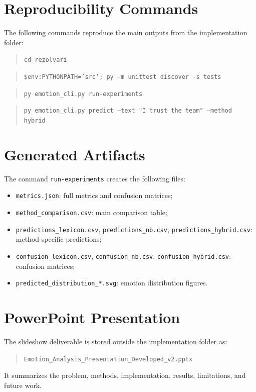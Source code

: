 \section{Reproducibility Commands}

The following commands reproduce the main outputs from the implementation folder:

\begin{quote}
\texttt{cd rezolvari}
\end{quote}

\begin{quote}
\texttt{\$env:PYTHONPATH='src'; py -m unittest discover -s tests}
\end{quote}

\begin{quote}
\texttt{py emotion\_cli.py run-experiments}
\end{quote}

\begin{quote}
\texttt{py emotion\_cli.py predict --text "I trust the team" --method hybrid}
\end{quote}

\section{Generated Artifacts}

The command \texttt{run-experiments} creates the following files:

\begin{itemize}
    \item \texttt{metrics.json}: full metrics and confusion matrices;
    \item \texttt{method\_comparison.csv}: main comparison table;
    \item \texttt{predictions\_lexicon.csv}, \texttt{predictions\_nb.csv}, \texttt{predictions\_hybrid.csv}: method-specific predictions;
    \item \texttt{confusion\_lexicon.csv}, \texttt{confusion\_nb.csv}, \texttt{confusion\_hybrid.csv}: confusion matrices;
    \item \texttt{predicted\_distribution\_*.svg}: emotion distribution figures.
\end{itemize}

\section{PowerPoint Presentation}

The slideshow deliverable is stored outside the implementation folder as:

\begin{quote}
\texttt{Emotion\_Analysis\_Presentation\_Developed\_v2.pptx}
\end{quote}

It summarizes the problem, methods, implementation, results, limitations, and future work.
